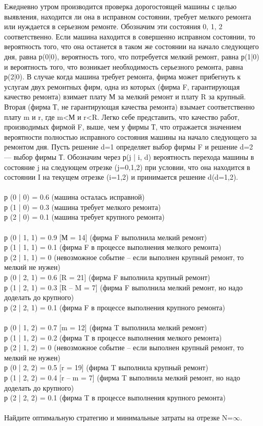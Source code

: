 \documentclass[14pt,a4paper,report]{report}
\begin{document}
Ежедневно утром производится проверка дорогостоящей машины с целью выявления, находится ли она в исправном состоянии, требует мелкого ремонта или нуждается в серьезном ремонте. Обозначим эти состояния 0, 1, 2 соответственно. Если машина находится в совершенно исправном состоянии, то вероятность того, что она останется в таком же состоянии на начало следующего дня, равна р(0|0), вероятность того, что потребуется мелкий ремонт, равна р(1|0) и вероятность того, что возникает необходимость серьезного ремонта, равна р(2|0). В случае когда машина требует ремонта, фирма может прибегнуть к услугам двух ремонтных фирм, одна из которых (фирма F, гарантирующая качество ремонта) взимает плату М за мелкий ремонт и плату R за крупный. Вторая (фирма Т, не гарантирующая качества ремонта) взымает соответственно плату m и r, где m<М и r<R. Легко себе представить, что качество работ, производимых фирмой F, выше, чем у фирмы Т, что отражается значением вероятности полностью исправного состояния машины на начало следующего за ремонтом дня. Пусть решение d=1 определяет выбор фирмы F и решение d=2 — выбор фирмы Т. Обозначим через р(j | i, d) вероятность перехода машины в состояние j на следующем отрезке (j=0,1,2) при условии, что она находится в состоянии I на текущем отрезке (i=1,2) и принимается решение d(d=1,2).
\\\\
р (0 | 0) = 0.6 (машина осталась исправной)\\
р (1 | 0) = 0.3 (машина требует мелкого ремонта)\\
р (2 | 0) = 0.1 (машина требует крупного ремонта)\\\\
р (0 | 1, 1) = 0.9 [М = 14] (фирма F выполнила мелкий ремонт)\\
р (1 | 1, 1) = 0.1 (фирма F в процессе выполнения мелкого ремонта)\\
р (2 | 1, 1) = 0 (невозможное событие -- если выполнен крупный ремонт, то мелкий не нужен)\\
р (0 | 2, 1) = 0.6 [R = 21] (фирма F выполнила крупный ремонт)\\
р (1 | 2, 1) = 0.3 [R – M = 7] (фирма F выполнила мелкий ремонт, но надо доделать до крупного)\\
р (2 | 2, 1) = 0.1 (фирма F в процессе выполнения крупного ремонта)\\\\
р (0 | 1, 2) = 0.7 [m = 12] (фирма T выполнила мелкий ремонт)\\
р (1 | 1, 2) = 0.2 (фирма T в процессе выполнения мелкого ремонта)\\
р (2 | 1, 2) = 0 (невозможное событие -- если выполнен крупный ремонт, то мелкий не нужен)\\
р (0 | 2, 2) = 0.5 [r = 19] (фирма T выполнила крупный ремонт)\\
р (1 | 2, 2) = 0.4 [r – m = 7] (фирма T выполнила мелкий ремонт, но надо доделать до крупного)\\
р (2 | 2, 2) = 0.1 (фирма T в процессе выполнения крупного ремонта)\\
\\
Найдите оптимальную стратегию и минимальные затраты на отрезке N=$\infty$.
\end{document}
